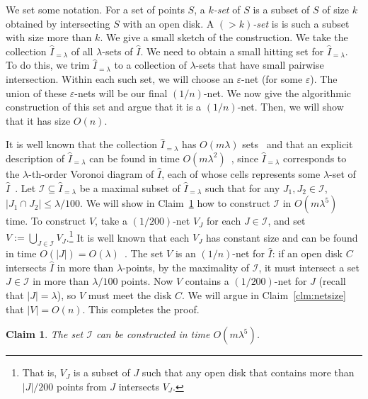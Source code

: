 \documentclass{siamltex}
\newcommand{\cI}{\mathcal{I}}
\newcommand{\eps}{\varepsilon}
\newcommand{\eqdef}{:=}
\newtheorem{claim}[theorem]{Claim}
\begin{document}
We set some notation. For a set of points $S$, a \emph{$k$-set}
of $S$ is a subset of $S$ of size $k$ obtained by intersecting $S$
with an open disk. A \emph{$(>k)$-set} is is such a subset with size 
more than $k$.
We give a small sketch of the construction. We take the
collection $\hat I_{=\lambda}$ of  all $\lambda$-sets
of $\hat I$. 
We need to obtain a small hitting set for $\hat I_{=\lambda}$.
To do this, we trim $\hat I_{=\lambda}$ to
a collection of $\lambda$-sets that have small pairwise intersection. 
Within each
such set, we will choose an $\eps$-net (for some  $\eps$). The union
of these $\eps$-nets will be our final $(1/n)$-net.
We now give the algorithmic construction of this set and argue that 
it is a $(1/n)$-net. Then, we will show that it has size $O(n)$.

It is well known that the collection
$\hat I_{= \lambda}$ has $O(m \lambda)$ sets~\cite{CS89,Lee82} and
that an explicit description of $\hat I_{= \lambda}$ 
can be found in time $O(m \lambda^2)$~\cite{AggarwalGuSaSh89,Lee82},
since $\hat I_{=\lambda}$ corresponds to the 
$\lambda$-th-order Voronoi diagram of $\hat I$, each of whose
cells represents some $\lambda$-set of $\hat I$~\cite{Lee82}.
Let $\cI \subseteq \hat I_{= \lambda}$ be a maximal subset
of $\hat I_{= \lambda}$ such that for any $J_1, J_2 \in \cI$,
$|J_1 \cap J_2| \leq \lambda/100$. 
We will show in Claim~\ref{clm:con-I} how to
construct $\cI$ in $O(m\lambda^5)$ time.
To construct $V$, take a $(1/200)$-net $V_J$ for each $J \in \cI$,
and set $V \eqdef \bigcup_{J \in \cI} V_J$.\footnote{That is,
$V_J$ is a subset of $J$ such that any open disk that contains more than
$|J|/200$ points from $J$ intersects $V_J$.} It is well known that each
$V_J$ has constant size and can be found in time 
$O(|J|) = O(\lambda)$~\cite[p. 180, Proof~I]{Chazelle00}.
The set $V$ is an $(1/n)$-net for $\hat I$: if an open disk $C$ intersects
$\hat I$ in more than $\lambda$-points, by the maximality of $\cI$, 
it must intersect a set $J \in \cI$ in more than $\lambda/100$ points. 
Now $V$ contains a $(1/200)$-net for $J$ (recall that $|J| = \lambda$),
so  $V$ must meet the disk $C$.
We will argue in Claim~\ref{clm:netsize} that $|V| = O(n)$. 
This completes the proof.
\medskip

\begin{claim} \label{clm:con-I} The set $\cI$ can
be constructed in time $O(m \lambda^5)$.
\end{claim}
\end{document}
